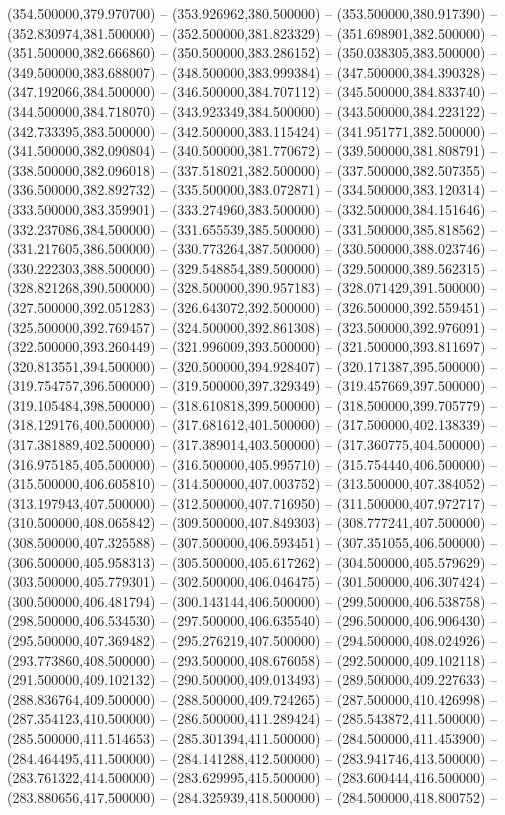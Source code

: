 (354.500000,379.970700) -- (353.926962,380.500000) -- (353.500000,380.917390) -- (352.830974,381.500000) -- (352.500000,381.823329) -- (351.698901,382.500000) -- (351.500000,382.666860) -- (350.500000,383.286152) -- (350.038305,383.500000) -- (349.500000,383.688007) -- (348.500000,383.999384) -- (347.500000,384.390328) -- (347.192066,384.500000) -- (346.500000,384.707112) -- (345.500000,384.833740) -- (344.500000,384.718070) -- (343.923349,384.500000) -- (343.500000,384.223122) -- (342.733395,383.500000) -- (342.500000,383.115424) -- (341.951771,382.500000) -- (341.500000,382.090804) -- (340.500000,381.770672) -- (339.500000,381.808791) -- (338.500000,382.096018) -- (337.518021,382.500000) -- (337.500000,382.507355) -- (336.500000,382.892732) -- (335.500000,383.072871) -- (334.500000,383.120314) -- (333.500000,383.359901) -- (333.274960,383.500000) -- (332.500000,384.151646) -- (332.237086,384.500000) -- (331.655539,385.500000) -- (331.500000,385.818562) -- (331.217605,386.500000) -- (330.773264,387.500000) -- (330.500000,388.023746) -- (330.222303,388.500000) -- (329.548854,389.500000) -- (329.500000,389.562315) -- (328.821268,390.500000) -- (328.500000,390.957183) -- (328.071429,391.500000) -- (327.500000,392.051283) -- (326.643072,392.500000) -- (326.500000,392.559451) -- (325.500000,392.769457) -- (324.500000,392.861308) -- (323.500000,392.976091) -- (322.500000,393.260449) -- (321.996009,393.500000) -- (321.500000,393.811697) -- (320.813551,394.500000) -- (320.500000,394.928407) -- (320.171387,395.500000) -- (319.754757,396.500000) -- (319.500000,397.329349) -- (319.457669,397.500000) -- (319.105484,398.500000) -- (318.610818,399.500000) -- (318.500000,399.705779) -- (318.129176,400.500000) -- (317.681612,401.500000) -- (317.500000,402.138339) -- (317.381889,402.500000) -- (317.389014,403.500000) -- (317.360775,404.500000) -- (316.975185,405.500000) -- (316.500000,405.995710) -- (315.754440,406.500000) -- (315.500000,406.605810) -- (314.500000,407.003752) -- (313.500000,407.384052) -- (313.197943,407.500000) -- (312.500000,407.716950) -- (311.500000,407.972717) -- (310.500000,408.065842) -- (309.500000,407.849303) -- (308.777241,407.500000) -- (308.500000,407.325588) -- (307.500000,406.593451) -- (307.351055,406.500000) -- (306.500000,405.958313) -- (305.500000,405.617262) -- (304.500000,405.579629) -- (303.500000,405.779301) -- (302.500000,406.046475) -- (301.500000,406.307424) -- (300.500000,406.481794) -- (300.143144,406.500000) -- (299.500000,406.538758) -- (298.500000,406.534530) -- (297.500000,406.635540) -- (296.500000,406.906430) -- (295.500000,407.369482) -- (295.276219,407.500000) -- (294.500000,408.024926) -- (293.773860,408.500000) -- (293.500000,408.676058) -- (292.500000,409.102118) -- (291.500000,409.102132) -- (290.500000,409.013493) -- (289.500000,409.227633) -- (288.836764,409.500000) -- (288.500000,409.724265) -- (287.500000,410.426998) -- (287.354123,410.500000) -- (286.500000,411.289424) -- (285.543872,411.500000) -- (285.500000,411.514653) -- (285.301394,411.500000) -- (284.500000,411.453900) -- (284.464495,411.500000) -- (284.141288,412.500000) -- (283.941746,413.500000) -- (283.761322,414.500000) -- (283.629995,415.500000) -- (283.600444,416.500000) -- (283.880656,417.500000) -- (284.325939,418.500000) -- (284.500000,418.800752) -- 